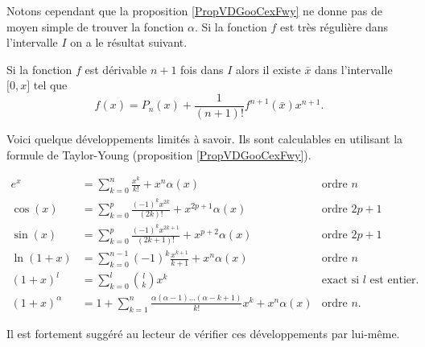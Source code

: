 Notons cependant que la proposition \ref{PropVDGooCexFwy} ne donne pas de moyen simple de trouver la fonction \( \alpha\). Si la fonction $f$ est très régulière dans l'intervalle $I$ on a le résultat suivant.

\begin{proposition}
    Si la fonction $f$ est dérivable $n+1$ fois dans $I$ alors il existe $\bar x$ dans l'intervalle \( \mathopen[ 0 , x \mathclose]\) tel que
  \begin{equation}
    f(x) = P_n(x) + \frac{1}{(n+1)!} f^{n+1}(\bar x) x^{n+1}.
  \end{equation}
\end{proposition}
Voici quelque développements limités à savoir. Ils sont calculables en utilisant la formule de Taylor-Young (proposition \ref{PropVDGooCexFwy}).
\begin{framed}
    \begin{subequations}  \label{SUBEQSooIFXBooIOkveI}
    \begin{align}
      e^x&=\sum_{k=0}^n\frac{ x^k }{ k! }+x^n\alpha(x)&\text{ordre } n\\
      \cos(x)&=\sum_{k=0}^p\frac{ (-1)^kx^{2k} }{ (2k)! }+x^{2p+1}\alpha(x)&\text{ordre } 2p+1    \label{subeqCBQooTZGxQpcos}\\
      \sin(x)&=\sum_{k=0}^p\frac{ (-1)^kx^{2k+1} }{ (2k+1)! }+x^{p+2}\alpha(x)&\text{ordre } 2p+1 \label{subeqCBQooTZGxQpsin}\\
      \ln(1+x)&=\sum_{k=0}^{n-1}(-1)^k\frac{ x^{k+1} }{ k+1 }+x^n\alpha(x)&\text{ordre } n\\
      (1+x)^l&=\sum_{k=0}^l\binom{ l }{ k }x^k&\text{exact si } l\text{ est entier.}\\
      (1+x)^{\alpha}&=1+\sum_{k=1}^n\frac{ \alpha(\alpha-1)\ldots(\alpha-k+1) }{ k! }x^k+x^n\alpha(x)&\text{ordre } n.\label{subEqJFNooQQodFQ}
    \end{align}
  \end{subequations}
\end{framed}
Il est fortement suggéré au lecteur de vérifier ces développements par lui-même.

